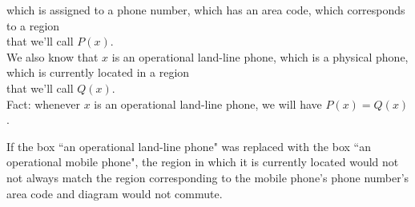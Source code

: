 \documentclass[12pt]{article}
\theoremstyle{remark}
\theoremstyle{definition}
\begin{document}
\begin{large}
\begin{Exercise}
which is assigned to a phone number, which has an area code, which corresponds to a region\\
that we'll call $P(x)$.\\
We also know that $x$ is an operational land-line phone,
which is a physical phone, which is currently located in a region\\
that we'll call $Q(x)$.\\
Fact: whenever $x$ is an operational land-line phone, we will have $P(x)=Q(x)$.\\ 
\end{Exercise}
\begin{Exercise}
If the box  ``an operational land-line phone" was replaced with the box ``an operational mobile phone", the region in which it is currently located would not not always match the region corresponding to the mobile phone's phone number's area code and diagram would not commute.
\end{Exercise}
\begin{Exercise}

\end{Exercise}
\end{large}
\end{document}
